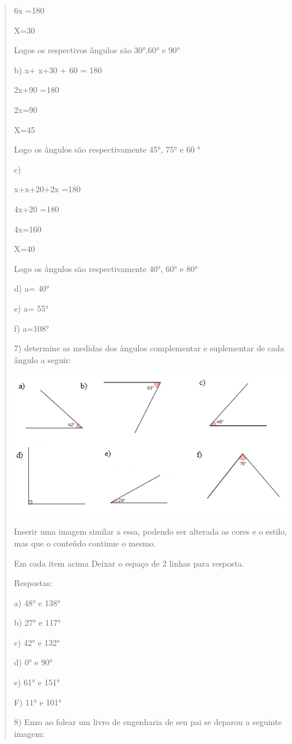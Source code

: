 \begin{quote}
\begin{escolha}
6x =180

X=30

Logos os respectivos ângulos são 30°,60° e 90°

b) x+ x+30 + 60 = 180

2x+90 =180

2x=90

X=45

Logo os ângulos são respectivamente 45°, 75° e 60 °

c)

x+x+20+2x =180

4x+20 =180

4x=160

X=40

Logo os ângulos são respectivamente 40°, 60° e 80°

d) a= 40°

e) a= 55°

f) a=108°

7) determine as medidas dos ângulos complementar e suplementar de cada
ângulo a seguir:

\includegraphics[width=4.81667in,height=2.48373in]{./imgSAEB_8_MAT/media/image30.png}

Inserir uma imagem similar a essa, podendo ser alterada as cores e o
estilo, mas que o conteúdo continue o mesmo.

Em cada item acima Deixar o espaço de 2 linhas para resposta.

Respostas:

a) 48° e 138°

b) 27° e 117°

c) 42° e 132°

d) 0° e 90°

e) 61° e 151°

F) 11° e 101°

8) Enzo ao folear um livro de engenharia de seu pai se deparou a
seguinte imagem:


\end{escolha}
\end{quote}
